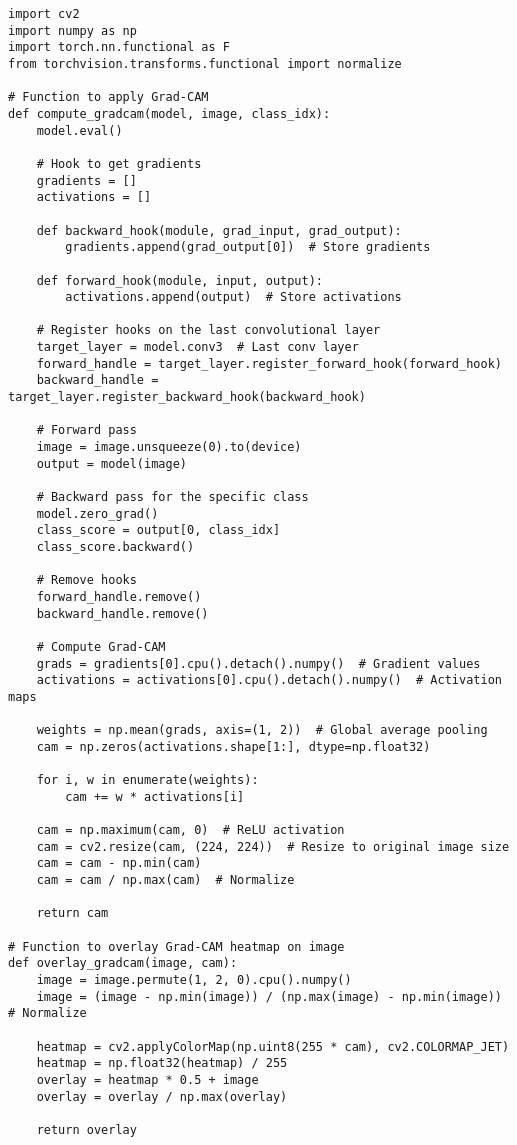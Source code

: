 \documentclass{article}
\begin{document}
\begin{verbatim}
import cv2
import numpy as np
import torch.nn.functional as F
from torchvision.transforms.functional import normalize

# Function to apply Grad-CAM
def compute_gradcam(model, image, class_idx):
    model.eval()

    # Hook to get gradients
    gradients = []
    activations = []

    def backward_hook(module, grad_input, grad_output):
        gradients.append(grad_output[0])  # Store gradients

    def forward_hook(module, input, output):
        activations.append(output)  # Store activations

    # Register hooks on the last convolutional layer
    target_layer = model.conv3  # Last conv layer
    forward_handle = target_layer.register_forward_hook(forward_hook)
    backward_handle = target_layer.register_backward_hook(backward_hook)

    # Forward pass
    image = image.unsqueeze(0).to(device)
    output = model(image)

    # Backward pass for the specific class
    model.zero_grad()
    class_score = output[0, class_idx]
    class_score.backward()

    # Remove hooks
    forward_handle.remove()
    backward_handle.remove()

    # Compute Grad-CAM
    grads = gradients[0].cpu().detach().numpy()  # Gradient values
    activations = activations[0].cpu().detach().numpy()  # Activation maps

    weights = np.mean(grads, axis=(1, 2))  # Global average pooling
    cam = np.zeros(activations.shape[1:], dtype=np.float32)

    for i, w in enumerate(weights):
        cam += w * activations[i]

    cam = np.maximum(cam, 0)  # ReLU activation
    cam = cv2.resize(cam, (224, 224))  # Resize to original image size
    cam = cam - np.min(cam)
    cam = cam / np.max(cam)  # Normalize

    return cam

# Function to overlay Grad-CAM heatmap on image
def overlay_gradcam(image, cam):
    image = image.permute(1, 2, 0).cpu().numpy()
    image = (image - np.min(image)) / (np.max(image) - np.min(image))  # Normalize

    heatmap = cv2.applyColorMap(np.uint8(255 * cam), cv2.COLORMAP_JET)
    heatmap = np.float32(heatmap) / 255
    overlay = heatmap * 0.5 + image
    overlay = overlay / np.max(overlay)

    return overlay

\end{verbatim}
\end{document}
